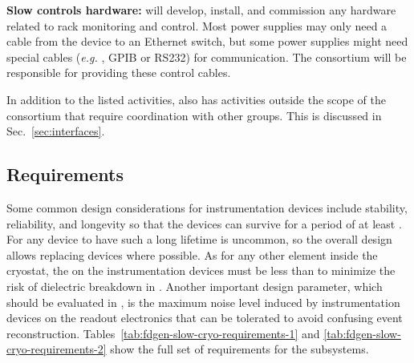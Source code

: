 %
\textbf{Slow controls hardware:}  will develop, install, and commission any hardware related to rack monitoring and control. Most power supplies may only need a cable from the device
to an Ethernet switch, but some power supplies might need special cables ({\em e.g.}  , GPIB or RS232) for communication. The  consortium will be responsible for providing these control cables.

In addition to the listed activities,  also has activities outside the scope of the consortium that require coordination with other groups. This is discussed in Sec.~\ref{sec:interfaces}.

\subsection{Requirements}

Some common design considerations for instrumentation devices include stability, reliability, and longevity so that the devices can survive for a period of at least \dunelifetime.  For any device to have such a long lifetime is uncommon, so the overall design allows replacing devices where possible. As for any other element inside the cryostat, the \efield  on the instrumentation devices must be less than \localefield to minimize the risk of dielectric breakdown in . Another important design parameter, which should be evaluated in , is the maximum noise level induced by instrumentation devices on the readout electronics that can be tolerated to avoid confusing event reconstruction.  Tables~\ref{tab:fdgen-slow-cryo-requirements-1} and \ref{tab:fdgen-slow-cryo-requirements-2} show the full set of requirements for the  subsystems.

